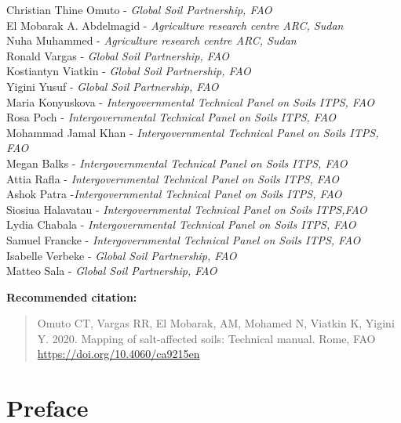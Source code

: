 \documentclass[
  10pt,
  b5paper,
]{book}
\begin{document}
Christian Thine Omuto - \emph{Global Soil Partnership, FAO }\\
El Mobarak A. Abdelmagid - \emph{Agriculture research centre ARC, Sudan}\\
Nuha Muhammed - \emph{Agriculture research centre ARC, Sudan}\\
Ronald Vargas - \emph{Global Soil Partnership, FAO }\\
Kostiantyn Viatkin - \emph{Global Soil Partnership, FAO }\\
Yigini Yusuf - \emph{Global Soil Partnership, FAO }\\
Maria Konyuskova - \emph{Intergovernmental Technical Panel on Soils ITPS, FAO}\\
Rosa Poch - \emph{Intergovernmental Technical Panel on Soils ITPS, FAO}\\
Mohammad Jamal Khan - \emph{Intergovernmental Technical Panel on Soils ITPS, FAO}\\
Megan Balks - \emph{Intergovernmental Technical Panel on Soils ITPS, FAO}\\
Attia Rafla - \emph{Intergovernmental Technical Panel on Soils ITPS, FAO}\\
Ashok Patra -\emph{Intergovernmental Technical Panel on Soils ITPS, FAO}\\
Siosiua Halavatau - \emph{Intergovernmental Technical Panel on Soils ITPS,FAO}\\
Lydia Chabala - \emph{Intergovernmental Technical Panel on Soils ITPS, FAO}\\
Samuel Francke - \emph{Intergovernmental Technical Panel on Soils ITPS, FAO}\\
Isabelle Verbeke - \emph{Global Soil Partnership, FAO }\\
Matteo Sala - \emph{Global Soil Partnership, FAO }

\textbf{Recommended citation:}

\begin{quote}
Omuto CT, Vargas RR, El Mobarak, AM, Mohamed N, Viatkin K, Yigini Y. 2020. Mapping of salt-affected soils: Technical manual. Rome, FAO
\url{https://doi.org/10.4060/ca9215en}
\end{quote}

\hypertarget{preface}{%
\chapter*{Preface}\label{preface}}
\end{document}

